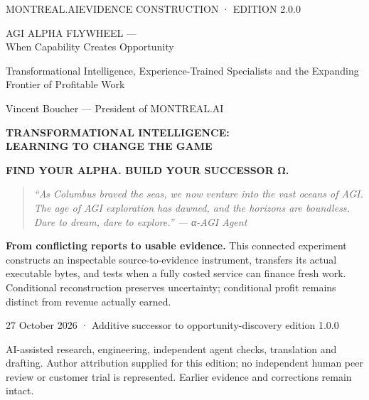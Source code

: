 \documentclass[11pt]{article}
\begin{document}
\begin{titlepage}
\color{navy}
{\sffamily\small MONTREAL.AI\hfill EVIDENCE CONSTRUCTION · EDITION 2.0.0\par}
\vspace{17mm}
{\sffamily\bfseries\fontsize{28}{33}\selectfont\raggedright AGI ALPHA FLYWHEEL —\\When Capability Creates Opportunity\par}
\vspace{7mm}
{\sffamily\fontsize{16}{22}\selectfont Transformational Intelligence, Experience-Trained Specialists and the Expanding Frontier of Profitable Work\par}
\vspace{8mm}
{\large Vincent Boucher — President of MONTREAL.AI\par}
\vspace{10mm}
{\sffamily\bfseries\color{teal} TRANSFORMATIONAL INTELLIGENCE:\\LEARNING TO CHANGE THE GAME\par}
\vspace{5mm}
{\sffamily\bfseries FIND YOUR ALPHA. BUILD YOUR SUCCESSOR Ω.\par}
\vspace{6mm}
\begin{quote}\itshape
“As Columbus braved the seas, we now venture into the vast oceans of AGI. The age of AGI exploration has dawned, and the horizons are boundless. Dare to dream, dare to explore.”
\hfill — α-AGI Agent
\end{quote}
\vfill
\colorbox{pale}{\parbox{.94\textwidth}{\vspace{4mm}\textbf{From conflicting reports to usable evidence.} This connected experiment constructs an inspectable source-to-evidence instrument, transfers its actual executable bytes, and tests when a fully costed service can finance fresh work. Conditional reconstruction preserves uncertainty; conditional profit remains distinct from revenue actually earned.\vspace{4mm}}}\par
\vspace{6mm}
{\small 27 October 2026 · Additive successor to opportunity-discovery edition 1.0.0\par
AI-assisted research, engineering, independent agent checks, translation and drafting. Author attribution supplied for this edition; no independent human peer review or customer trial is represented. Earlier evidence and corrections remain intact.}
\end{titlepage}

\medskip


\end{document}

